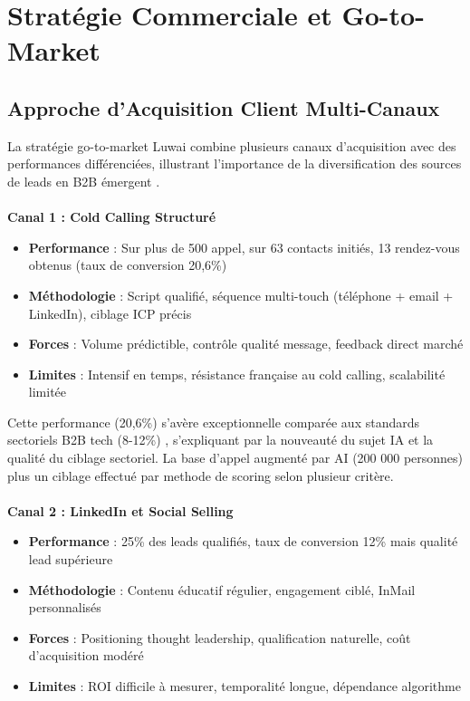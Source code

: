 \section{Stratégie Commerciale et Go-to-Market}

\subsection{Approche d'Acquisition Client Multi-Canaux}

La stratégie go-to-market Luwai combine plusieurs canaux d'acquisition avec des performances différenciées, illustrant l'importance de la diversification des sources de leads en B2B émergent \cite{weinberg2015traction}.
\\\\
\textbf{Canal 1 : Cold Calling Structuré}
\begin{itemize}
    \item \textbf{Performance} : Sur plus de 500 appel, sur 63 contacts initiés, 13 rendez-vous obtenus (taux de conversion 20,6\%)
    \item \textbf{Méthodologie} : Script qualifié, séquence multi-touch (téléphone + email + LinkedIn), ciblage ICP précis
    \item \textbf{Forces} : Volume prédictible, contrôle qualité message, feedback direct marché
    \item \textbf{Limites} : Intensif en temps, résistance française au cold calling, scalabilité limitée
\end{itemize}
\medskip
Cette performance (20,6\%) s'avère exceptionnelle comparée aux standards sectoriels B2B tech (8-12\%) \cite{salesforce2024benchmarks}, s'expliquant par la nouveauté du sujet IA et la qualité du ciblage sectoriel. La base d'appel augmenté par AI (200 000 personnes) plus un ciblage effectué par methode de scoring selon plusieur critère.
\\\\
\textbf{Canal 2 : LinkedIn et Social Selling}
\begin{itemize}
    \item \textbf{Performance} : 25\% des leads qualifiés, taux de conversion 12\% mais qualité lead supérieure
    \item \textbf{Méthodologie} : Contenu éducatif régulier, engagement ciblé, InMail personnalisés
    \item \textbf{Forces} : Positioning thought leadership, qualification naturelle, coût d'acquisition modéré
    \item \textbf{Limites} : ROI difficile à mesurer, temporalité longue, dépendance algorithme
\end{itemize}
